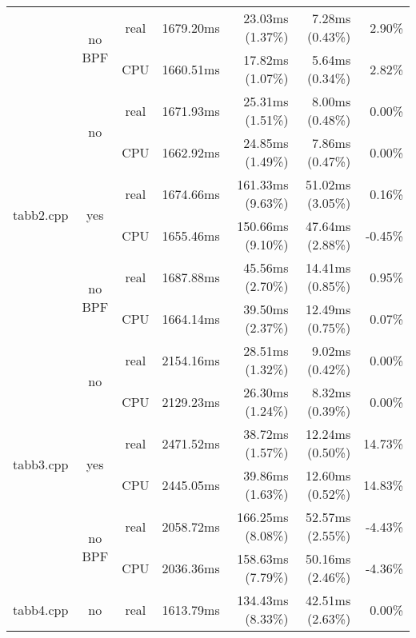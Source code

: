 \documentclass[en]{pracamgr}
\begin{document}
\begin{small}
\begin{longtable}{|l|c|c|r|r|r|r|}
                            \cline{2-7}
                            & \multirow{2}{*}{no BPF} & real & 1679.20ms & 23.03ms (1.37\%) & 7.28ms (0.43\%) & 2.90\% \\*
                            &                         & CPU  & 1660.51ms & 17.82ms (1.07\%) & 5.64ms (0.34\%) & 2.82\% \\
\hline
\multirow{6}{*}{tabb2.cpp}  & \multirow{2}{*}{no}     & real & 1671.93ms & 25.31ms (1.51\%) & 8.00ms (0.48\%) & 0.00\% \\*
                            &                         & CPU  & 1662.92ms & 24.85ms (1.49\%) & 7.86ms (0.47\%) & 0.00\% \\*
                            \cline{2-7}
                            & \multirow{2}{*}{yes}    & real & 1674.66ms & 161.33ms (9.63\%) & 51.02ms (3.05\%) & 0.16\% \\*
                            &                         & CPU  & 1655.46ms & 150.66ms (9.10\%) & 47.64ms (2.88\%) & -0.45\% \\*
                            \cline{2-7}
                            & \multirow{2}{*}{no BPF} & real & 1687.88ms & 45.56ms (2.70\%) & 14.41ms (0.85\%) & 0.95\% \\*
                            &                         & CPU  & 1664.14ms & 39.50ms (2.37\%) & 12.49ms (0.75\%) & 0.07\% \\
\hline
\multirow{6}{*}{tabb3.cpp}  & \multirow{2}{*}{no}     & real & 2154.16ms & 28.51ms (1.32\%) & 9.02ms (0.42\%) & 0.00\% \\*
                            &                         & CPU  & 2129.23ms & 26.30ms (1.24\%) & 8.32ms (0.39\%) & 0.00\% \\*
                            \cline{2-7}
                            & \multirow{2}{*}{yes}    & real & 2471.52ms & 38.72ms (1.57\%) & 12.24ms (0.50\%) & 14.73\% \\*
                            &                         & CPU  & 2445.05ms & 39.86ms (1.63\%) & 12.60ms (0.52\%) & 14.83\% \\*
                            \cline{2-7}
                            & \multirow{2}{*}{no BPF} & real & 2058.72ms & 166.25ms (8.08\%) & 52.57ms (2.55\%) & -4.43\% \\*
                            &                         & CPU  & 2036.36ms & 158.63ms (7.79\%) & 50.16ms (2.46\%) & -4.36\% \\
\hline
\multirow{6}{*}{tabb4.cpp}  & \multirow{2}{*}{no}     & real & 1613.79ms & 134.43ms (8.33\%) & 42.51ms (2.63\%) & 0.00\% \\*

\end{longtable}
\end{small}
\end{document}
